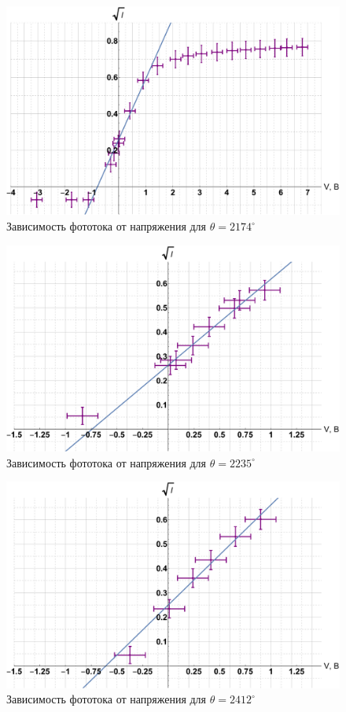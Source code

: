 \documentclass[12pt]{kiarticle}
\begin{document}
\begin{figure}[h!]
	\includegraphics[scale=0.5]{Ibig.pdf}
	\caption{Зависимость фототока от напряжения для $ \theta = 2174^\circ $}
	\label{graf_Ibig}
\end{figure} 

\begin{figure}[h!]
	\includegraphics[scale=0.5]{2235.pdf}
	\caption{Зависимость фототока от напряжения для $ \theta = 2235^\circ $}
	\label{graf 2235}
\end{figure} 

\begin{figure}[h!]
	\includegraphics[scale=0.5]{2412.pdf}
	\caption{Зависимость фототока от напряжения для $ \theta = 2412^\circ $}
	\label{graf 2412}
\end{figure} 
\end{document}
